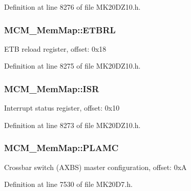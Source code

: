 Definition at line 8276 of file M\+K20\+D\+Z10.\+h.

\subsubsection[{\texorpdfstring{E\+T\+B\+RL}{ETBRL}}]{ M\+C\+M\+\_\+\+Mem\+Map\+::\+E\+T\+B\+RL}\hypertarget{struct_m_c_m___mem_map_ae4d8c3979038482e324840c3bfa856d7}{}\label{struct_m_c_m___mem_map_ae4d8c3979038482e324840c3bfa856d7}
E\+TB reload register, offset\+: 0x18 

Definition at line 8275 of file M\+K20\+D\+Z10.\+h.

\subsubsection[{\texorpdfstring{I\+SR}{ISR}}]{ M\+C\+M\+\_\+\+Mem\+Map\+::\+I\+SR}\hypertarget{struct_m_c_m___mem_map_a94394dd07a739357ea5163369af0fbb6}{}\label{struct_m_c_m___mem_map_a94394dd07a739357ea5163369af0fbb6}
Interrupt status register, offset\+: 0x10 

Definition at line 8273 of file M\+K20\+D\+Z10.\+h.

\subsubsection[{\texorpdfstring{P\+L\+A\+MC}{PLAMC}}]{ M\+C\+M\+\_\+\+Mem\+Map\+::\+P\+L\+A\+MC}\hypertarget{struct_m_c_m___mem_map_a7d749b910777a6b67ea94f2379c628ee}{}\label{struct_m_c_m___mem_map_a7d749b910777a6b67ea94f2379c628ee}
Crossbar switch (A\+X\+BS) master configuration, offset\+: 0xA 

Definition at line 7530 of file M\+K20\+D7.\+h.

